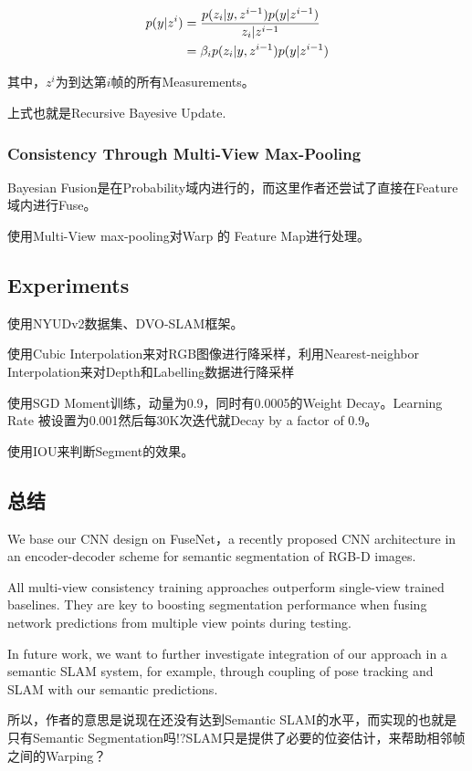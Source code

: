 \begin{align}
p(y|z^i) & = \frac{p(z_i|y, z^{i-1})p(y | z^{i-1})}{z_i|z^{i - 1}} \notag \\
         & = \beta_i p(z_i | y, z^{i-1}) p(y | z^{i-1}) \notag
\end{align}

其中，$z^i$为到达第$i$帧的所有Measurements。

上式也就是Recursive Bayesive Update.

\subsubsection{Consistency Through Multi-View Max-Pooling}

Bayesian Fusion是在Probability域内进行的，而这里作者还尝试了直接在Feature域内进行Fuse。

使用Multi-View max-pooling对Warp 的 Feature Map进行处理。

\subsection{Experiments}

使用NYUDv2数据集、DVO-SLAM框架。

使用Cubic Interpolation来对RGB图像进行降采样，利用Nearest-neighbor Interpolation来对Depth和Labelling数据进行降采样

使用SGD Moment训练，动量为0.9，同时有0.0005的Weight Decay。Learning Rate 被设置为0.001然后每30K次迭代就Decay by a factor of 0.9。

使用IOU来判断Segment的效果。

\subsection{总结}

We base our CNN design on FuseNet，a recently proposed CNN architecture in an encoder-decoder scheme for semantic segmentation of RGB-D images.

All multi-view consistency training approaches outperform single-view trained baselines. They are key to boosting segmentation performance when fusing network predictions from multiple view points during  testing.

In future work, we want to further investigate integration of our approach in a semantic SLAM system, for example, through coupling of pose tracking and SLAM with our semantic predictions.

所以，作者的意思是说现在还没有达到Semantic SLAM的水平，而实现的也就是只有Semantic Segmentation吗!?SLAM只是提供了必要的位姿估计，来帮助相邻帧之间的Warping？

